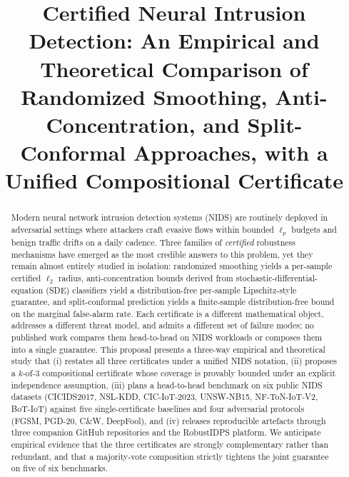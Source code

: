 \documentclass[journal,twoside]{IEEEtran}
\begin{document}
\title{Certified Neural Intrusion Detection: An Empirical and
Theoretical Comparison of Randomized Smoothing, Anti-Concentration, and
Split-Conformal Approaches, with a Unified Compositional Certificate}

\author{%
  \and
}

\maketitle

\begin{abstract}
Modern neural network intrusion detection systems (NIDS) are routinely
deployed in adversarial settings where attackers craft evasive flows
within bounded $\ell_p$ budgets and benign traffic drifts on a daily
cadence. Three families of \emph{certified} robustness mechanisms have
emerged as the most credible answers to this problem, yet they remain
almost entirely studied in isolation: randomized smoothing yields a
per-sample certified $\ell_2$ radius, anti-concentration bounds derived
from stochastic-differential-equation (SDE) classifiers yield a
distribution-free per-sample Lipschitz-style guarantee, and
split-conformal prediction yields a finite-sample distribution-free
bound on the marginal false-alarm rate. Each certificate is a different
mathematical object, addresses a different threat model, and admits a
different set of failure modes; no published work compares them
head-to-head on NIDS workloads or composes them into a single guarantee.
This proposal presents a three-way empirical and theoretical study that
(i) restates all three certificates under a unified NIDS notation,
(ii) proposes a $k$-of-$3$ compositional certificate whose coverage is
provably bounded under an explicit independence assumption,
(iii) plans a head-to-head benchmark on six public NIDS datasets
(CICIDS2017, NSL-KDD, CIC-IoT-2023, UNSW-NB15, NF-ToN-IoT-V2, BoT-IoT)
against five single-certificate baselines and four adversarial protocols
(FGSM, PGD-20, C\&W, DeepFool), and (iv) releases reproducible artefacts
through three companion GitHub repositories and the RobustIDPS platform.
We anticipate empirical evidence that the three certificates are
strongly complementary rather than redundant, and that a majority-vote
composition strictly tightens the joint guarantee on five of six
benchmarks.
\end{abstract}
\end{document}

